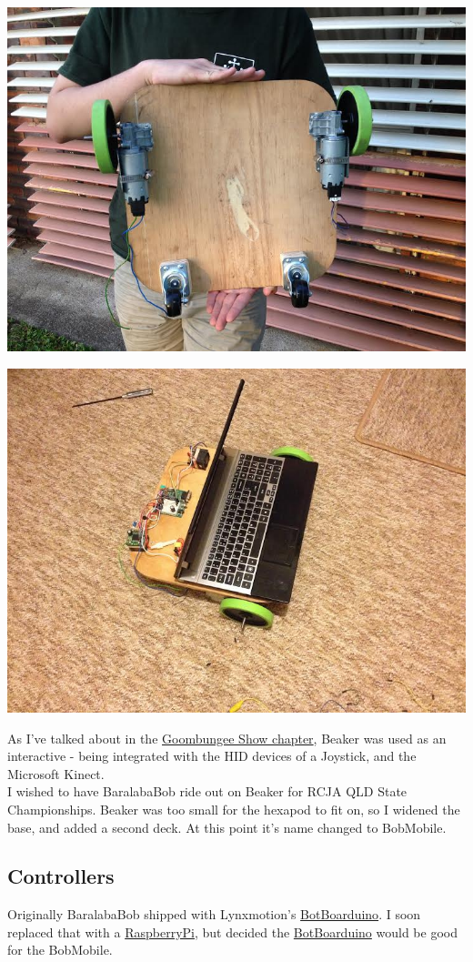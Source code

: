     		\centerline{\includegraphics[width=0.75\linewidth]{images/beaker_bottom}}
    		\centerline{\includegraphics[width=0.75\linewidth]{images/beaker_top}}
    		
    		As I've talked about in the \hyperref[chap:history]{Goombungee Show chapter}, Beaker was used as an interactive  - being integrated with the HID devices of a Joystick, and the Microsoft Kinect.\\
    		
    		I wished to have BaralabaBob ride out on Beaker for RCJA QLD State Championships. Beaker was too small for the hexapod to fit on, so I widened the base, and added a second deck. At this point it's name changed to BobMobile.\\
    		
    	\subsection{Controllers}
    		Originally BaralabaBob shipped with Lynxmotion's \hyperlink{http://www.lynxmotion.com/c-153-botboarduino.aspx}{BotBoarduino}. I soon replaced that with a \hyperref[RPi]{RaspberryPi}, but decided the \hyperref[BotBoarduino]{BotBoarduino} would be good for the BobMobile.\\
            
